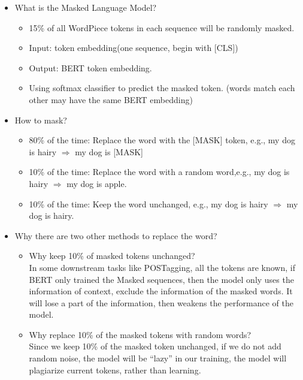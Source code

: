 \documentclass[]{krantz}
\providecommand{\tightlist}{%
  \setlength{\itemsep}{0pt}\setlength{\parskip}{0pt}}
\begin{document}
\begin{itemize}
\tightlist
\item
  What is the Masked Language Model?

  \begin{itemize}
  \tightlist
  \item
    15\% of all WordPiece tokens in each sequence will be randomly masked.
  \item
    Input: token embedding(one sequence, begin with {[}CLS{]})
  \item
    Output: BERT token embedding.
  \item
    Using softmax classifier to predict the masked token. (words match each other may have the same BERT embedding)
  \end{itemize}
\item
  How to mask?

  \begin{itemize}
  \tightlist
  \item
    80\% of the time: Replace the word with the {[}MASK{]} token, e.g., my dog is hairy \(\Rightarrow\) my dog is {[}MASK{]}
  \item
    10\% of the time: Replace the word with a random word,e.g., my dog is hairy \(\Rightarrow\) my dog is apple.
  \item
    10\% of the time: Keep the word unchanged, e.g., my dog is hairy \(\Rightarrow\) my dog is hairy.
  \end{itemize}
\item
  Why there are two other methods to replace the word?

  \begin{itemize}
  \tightlist
  \item
    Why keep 10\% of masked tokens unchanged?\\
    In some downstream tasks like POSTagging, all the tokens are known, if BERT only trained the Masked sequences, then the model only uses the information of context, exclude the information of the masked words. It will lose a part of the information, then weakens the performance of the model.
  \item
    Why replace 10\% of the masked tokens with random words?\\
    Since we keep 10\% of the masked token unchanged, if we do not add random noise, the model will be ``lazy'' in our training, the model will plagiarize current tokens, rather than learning.
  \end{itemize}
\end{itemize}
\end{document}
